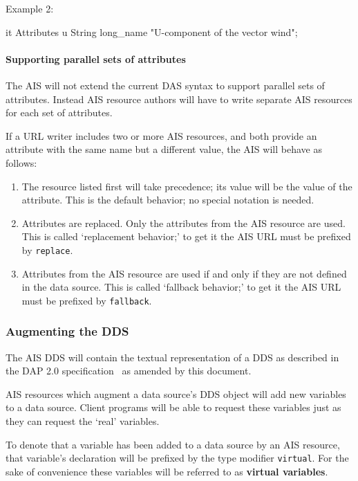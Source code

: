 \documentclass{article}
\begin{document}
Example 2:\\
\begin{vcode}{it}
Attributes {
  u {
    String long_name "U-component of the vector wind";
  }
}
\end{vcode}

\paragraph{Supporting parallel sets of attributes}

\cbstart
The \ac{AIS} will not extend the current DAS syntax to support parallel sets
of attributes. Instead \ac{AIS} resource authors will have to write separate
\ac{AIS} resources for each set of attributes. 
\cbend

If a \ac{URL} writer includes two or more \ac{AIS} resources, and both
provide an attribute with the same name but a different value, the \ac{AIS}
will behave as follows: 
\begin{enumerate}
\item The resource listed \cbstart first \cbend will take precedence; its
  value will be the value of the attribute. This is the default behavior; no
  special notation is needed.
\item Attributes are replaced. Only the attributes from the \ac{AIS} resource
  are used. This is called `replacement behavior;' to get it the \ac{AIS} URL
  must be prefixed by \texttt{replace}.
\item Attributes from the \ac{AIS} resource are used if and only if they are not defined
  in the data source. This is called `fallback behavior;' to get it the
  \ac{AIS} URL must be prefixed by \texttt{fallback}.
\end{enumerate}

\subsubsection{Augmenting the \ac{DDS}}
\label{sec:DDS}

The \ac{AIS} \ac{DDS} will contain the textual representation of a \ac{DDS}
as described in the DAP 2.0 specification~\cite{gallagher:dap-spec} 
as amended by this document.

\ac{AIS} resources which augment a data source's \ac{DDS} object will
add new variables to a data source. Client programs will be able to request
these variables just as they can request the `real' variables. 

To denote that a variable has been added to a data source by an \ac{AIS}
resource, that variable's declaration will be prefixed by the type modifier
\texttt{virtual}. For the sake of convenience these variables will be
referred to as \textbf{virtual variables}.
\end{document}
